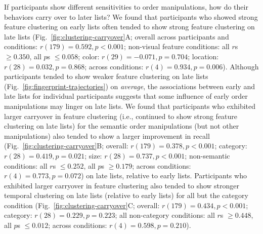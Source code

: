 \documentclass[11pt]{article}
\begin{document}
If participants show different sensitivities to order manipulations, how do
their behaviors carry over to later lists? We found that participants who
showed strong feature clustering on early lists often tended to show strong
feature clustering on late lists (Fig.~\ref{fig:clustering-carryover}A; overall
across participants and conditions: $r(179) = 0.592, p < 0.001$; non-visual
feature conditions: all $r$s $\geq 0.350$, all $p$s $\leq 0.058$; color: $r(29)
= -0.071, p = 0.704$; location: $r(28) = 0.032, p = 0.868$; across conditions:
$r(4) = 0.934, p = 0.006$). Although participants tended to show weaker feature
clustering on late lists (Fig.~\ref{fig:fingerprint-trajectories}) on
\textit{average}, the associations between early and late lists for individual
participants suggests that some influence of early order manipulations may
linger on late lists. We found that participants who exhibited larger carryover
in feature clustering (i.e., continued to show strong feature clustering on
late lists) for the semantic order manipulations (but not other manipulations)
also tended to show a larger improvement in recall
(Fig.~\ref{fig:clustering-carryover}B; overall: $r(179) = 0.378, p < 0.001$;
category: $r(28) = 0.419, p = 0.021$; size: $r(28) = 0.737, p < 0.001$;
non-semantic conditions: all $r$s $\leq 0.252$, all $p$s $\geq 0.179$; across
conditions: $r(4) = 0.773, p = 0.072$) on late lists, relative to early lists.
Participants who exhibited larger carryover in feature clustering also tended
to show stronger temporal clustering on late lists (relative to early lists)
for all but the category condition (Fig.~\ref{fig:clustering-carryover}C;
overall: $r(179) = 0.434, p < 0.001$; category: $r(28) = 0.229, p = 0.223$; all
non-category conditions: all $r$s $\geq 0.448$, all $p$s $\leq 0.012$; across
conditions: $r(4) = 0.598, p = 0.210$).
\end{document}

